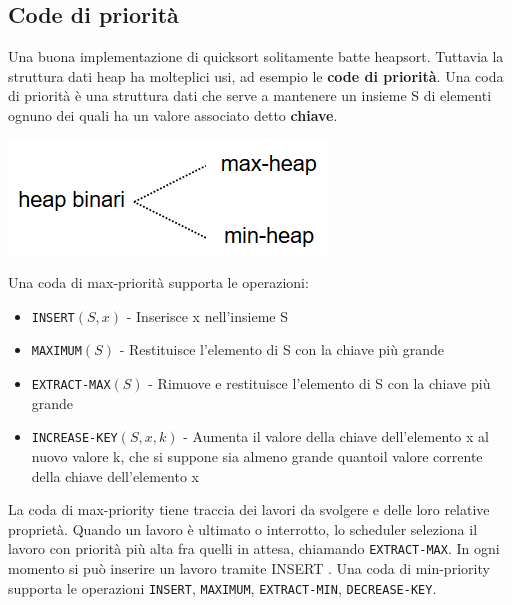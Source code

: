 \documentclass[11pt,a4paper]{article}
\begin{document}
\subsection{Code di priorità}
Una buona implementazione di quicksort solitamente batte heapsort. Tuttavia la struttura dati heap ha
molteplici usi, ad esempio le \textbf{code di priorità}.
Una coda di priorità è una struttura dati che serve a mantenere un insieme S di elementi ognuno dei quali ha
un valore associato detto \textbf{chiave}.
%
\begin{center}
      \includegraphics[scale=0.4]{img/codepriorita.png}
\end{center}
%
Una coda di max-priorità supporta le operazioni:
\begin{itemize}[leftmargin=*]
  \item \texttt{INSERT}$(S, x)$ - Inserisce x nell’insieme S
  \item \texttt{MAXIMUM}$(S)$ - Restituisce l’elemento di S con la chiave più grande
  \item \texttt{EXTRACT-MAX}$(S)$ - Rimuove e restituisce l’elemento di S con la chiave più grande
  \item \texttt{INCREASE-KEY}$(S, x, k)$ - Aumenta il valore della chiave dell’elemento x al nuovo valore k, che si suppone sia almeno grande quantoil valore corrente della chiave dell’elemento x
\end{itemize}

La coda di max-priority tiene traccia dei lavori da svolgere e delle loro relative proprietà. Quando un lavoro è
ultimato o interrotto, lo scheduler seleziona il lavoro con priorità più alta fra quelli in attesa, chiamando
\texttt{EXTRACT-MAX}. In ogni momento si può inserire un lavoro tramite INSERT .
Una coda di min-priority supporta le operazioni \texttt{INSERT}, \texttt{MAXIMUM}, \texttt{EXTRACT-MIN}, \texttt{DECREASE-KEY}.
\end{document}
